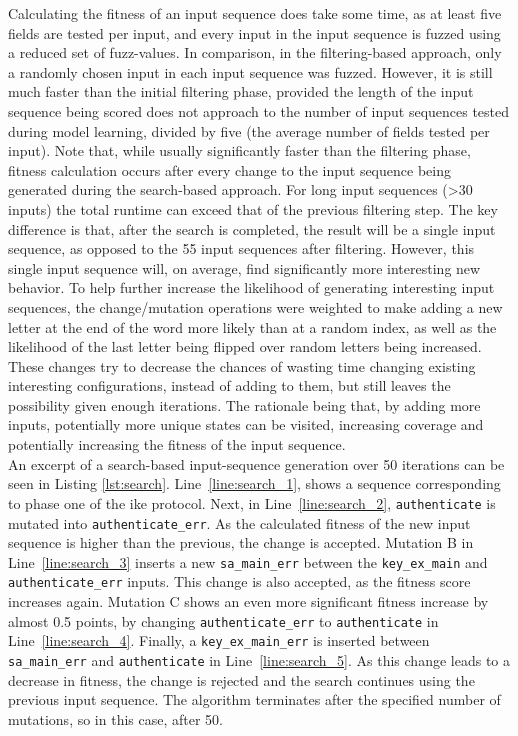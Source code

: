 Calculating the fitness of an input sequence does take some time, as at least five fields are tested per input, and every input in the input sequence is fuzzed using a reduced set of fuzz-values. In comparison, in the filtering-based approach, only a randomly chosen input in each input sequence was fuzzed. However, it is still much faster than the initial filtering phase, provided the length of the input sequence being scored does not approach to the number of input sequences tested during model learning, divided by five (the average number of fields tested per input). Note that, while usually significantly faster than the filtering phase, fitness calculation occurs after every change to the input sequence being generated during the search-based approach. For long input sequences (>30 inputs) the total runtime can exceed that of the previous filtering step. The key difference is that, after the search is completed, the result will be a single input sequence, as opposed to the 55 input sequences after filtering. However, this single input sequence will, on average, find significantly more interesting new behavior. To help further increase the likelihood of generating interesting input sequences, the change/mutation operations were weighted to make adding a new letter at the end of the word more likely than at a random index, as well as the likelihood of the last letter being flipped over random letters being increased. These changes try to decrease the chances of wasting time changing existing interesting configurations, instead of adding to them, but still leaves the possibility given enough iterations. The rationale being that, by adding more inputs, potentially more unique states can be visited, increasing coverage and potentially increasing the fitness of the input sequence. \\

An excerpt of a search-based input-sequence generation over 50 iterations can be seen in Listing \ref{lst:search}. 
Line~\ref{line:search_1}, shows a sequence corresponding to phase one of the \ac{ike} protocol. Next, in Line~\ref{line:search_2}, \texttt{authenticate} is mutated into \texttt{authenticate\_err}. As the calculated fitness of the new input sequence is higher than the previous, the change is accepted. Mutation B in Line~\ref{line:search_3} inserts a new \texttt{sa\_main\_err} between the \texttt{key\_ex\_main} and \texttt{authenticate\_err} inputs. This change is also accepted, as the fitness score increases again. Mutation C shows an even more significant fitness increase by almost 0.5 points, by changing \texttt{authenticate\_err} to \texttt{authenticate} in Line~\ref{line:search_4}. Finally, a \texttt{key\_ex\_main\_err} is inserted between \texttt{sa\_main\_err} and \texttt{authenticate} in Line~\ref{line:search_5}. As this change leads to a decrease in fitness, the change is rejected and the search continues using the previous input sequence. The algorithm terminates after the specified number of mutations, so in this case, after 50.

